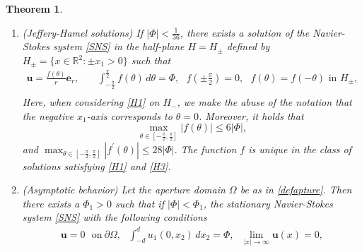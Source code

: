 \documentclass[reqno,12pt]{amsart}
\newtheorem{theorem}{Theorem}[section]
\newcommand{\Bv}{{\boldsymbol{v}}}
\newcommand{\Bu}{{\boldsymbol{u}}}
\newcommand{\Be}{{\boldsymbol{e}}}
\begin{document}
\begin{theorem}\label{TheromeGPS}\cite[Lemma 5.1, Theorem 5.1]{GaldiPadulaSolonnikov96}
\begin{enumerate}[(1)]
\item (Jeffery-Hamel solutions)
     If $|\Phi| < \frac{1}{36}$, there exists a solution of the Navier-Stokes system \eqref{SNS} in the half-plane $H =H_{\pm}$ defined by $H_\pm =\{ x\in \mathbb{R}^2: \pm x_1>0\} $ such that 
    \begin{equation}\label{H1}
    \begin{aligned}
        \Bu =\frac{f(\theta)}{r} \Be_r,
        \quad
         & \int_{-\frac{\pi}{2}}^{\frac{\pi}{2}} f(\theta)\, d \theta = \Phi, \ \ \ f\left(\pm \frac{\pi}{2}\right) = 0, \ \ \ f(\theta)= f(-\theta) \textrm{ in } H_{\pm},\\
          \end{aligned}
    \end{equation}
    Here, when considering \eqref{H1} on $H_-$, we make the abuse of the notation that the negative $x_1$-axis corresponds to $\theta=0$.
    Moreover, it holds that
    \begin{equation}\label{H3}
         \max_{\theta\in [-\frac{\pi}{2}, \frac{\pi}{2}]} |f(\theta)| \leq 6 |\Phi|,
    \end{equation}
    and $\displaystyle \max_{\theta\in [-\frac{\pi}{2}, \frac{\pi}{2} ]}|f^\prime (\theta)| \leq 28 |\Phi|. $ The function $f$ is unique in the class of solutions satisfying \eqref{H1} and \eqref{H3}. 
\item (Asymptotic behavior)
    Let the aperture
domain $\Omega$ be as in \eqref{defapture}. Then there exists a $\Phi_1>0$ such that if $|\Phi|< \Phi_1$, the stationary Navier-Stokes system \eqref{SNS} with the following conditions
  \begin{equation*}
  \begin{array}{ll}
        \displaystyle \Bu=0 \ \ \ \mbox{on}\ \partial \Omega, \ \ \ \int_{-d}^d u_1(0,x_2) \, dx_2 =\Phi, \ \ \ \lim_{|x|\to \infty} \Bu(x)= 0,
    \end{array} 
    \end{equation*}

\end{enumerate}
\end{theorem}
\end{document}
